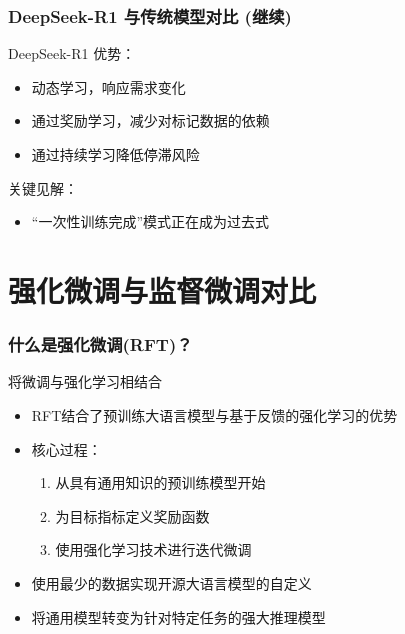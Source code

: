 \documentclass[aspectratio=169]{beamer}
\begin{document}
\begin{frame}
	\frametitle{DeepSeek-R1 与传统模型对比 (继续)}
	\begin{block}{DeepSeek-R1 优势：}
		\begin{itemize}
			\item 动态学习，响应需求变化
			\item 通过奖励学习，减少对标记数据的依赖
			\item 通过持续学习降低停滞风险
		\end{itemize}
	\end{block}
	\begin{block}{关键见解：}
		\begin{itemize}
			\item “一次性训练完成”模式正在成为过去式
		\end{itemize}
	\end{block}
\end{frame}

\section{强化微调与监督微调对比}

\begin{frame}
	\frametitle{什么是强化微调(RFT)？}
	\begin{block}{将微调与强化学习相结合}
		\begin{itemize}
			\item RFT结合了预训练大语言模型与基于反馈的强化学习的优势
			\item 核心过程：
			\begin{enumerate}
				\item 从具有通用知识的预训练模型开始
				\item 为目标指标定义奖励函数
				\item 使用强化学习技术进行迭代微调
			\end{enumerate}
			\item 使用最少的数据实现开源大语言模型的自定义
			\item 将通用模型转变为针对特定任务的强大推理模型
		\end{itemize}
	\end{block}
\end{frame}
\end{document}
